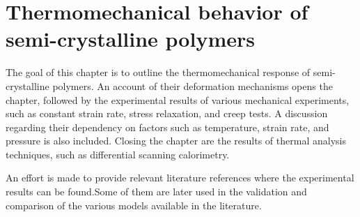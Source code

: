 \chapter{Thermomechanical behavior of semi-crystalline polymers} \label{ch:thermomechanical_behavior_semi_crystalline_polymer}






The goal of this chapter is to outline the thermomechanical response of semi-crystalline polymers.
An account of their deformation mechanisms opens the chapter, followed by the experimental results of various mechanical experiments, such as constant strain rate, stress relaxation, and creep tests.
A discussion regarding their dependency on factors such as temperature, strain rate, and pressure is also included.
Closing the chapter are the results of thermal analysis techniques, such as differential scanning calorimetry.

An effort is made to provide relevant literature references where the experimental results can be found.Some of them are later used in the validation and comparison of the various models available in the literature.

